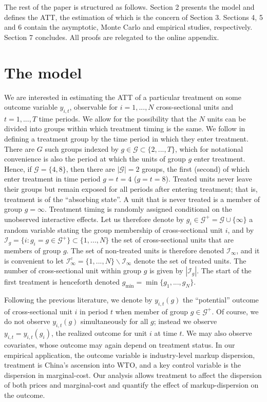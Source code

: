 \documentclass[12pt,fleqn]{article}
\begin{document}
The rest of the paper is structured as follows. Section 2 presents the model and defines the ATT, the estimation of which is the concern of Section 3. Sections 4, 5 and 6 contain the asymptotic, Monte Carlo and empirical studies, respectively. Section 7 concludes. All proofs are relegated to the online appendix.

\section{The model}

We are interested in estimating the ATT of a particular treatment on some outcome variable $y_{i,t}$, observable for $i=1,...,N$ cross-sectional units and $t=1,...,T$ time periods. We allow for the possibility that the $N$ units can be divided into groups within which treatment timing is the same. We follow \citet{Callaway_SantAnna_2020} in defining a treatment group by the time period in which they enter treatment. There are $G$ such groups indexed by $g\in \mathcal{G} \subset \{2,...,T\}$, which for notational convenience is also the period at which the units of group $g$ enter treatment. Hence, if $\mathcal{G} = \{4,8\}$, then there are $|\mathcal{G}| = 2$ groups, the first (second) of which enter treatment in time period $g = t=4$ ($g = t=8$). Treated units never leave their groups but remain exposed for all periods after entering treatment; that is, treatment is of the ``absorbing state''. A unit that is never treated is a member of group $g=\infty$. Treatment timing is randomly assigned conditional on the unobserved interactive effects. Let us therefore denote by $g_i \in \mathcal{G}^+ = \mathcal{G} \cup \{\infty\}$ a random variable stating the group membership of cross-sectional unit $i$, and by $\mathcal{I}_g = \{i: g_i = g \in \mathcal{G}^+\} \subset \{1,...,N\}$ the set of cross-sectional units that are members of group $g$. The set of non-treated units is therefore denoted $\mathcal{I}_\infty$, and it is convenient to let $\mathcal{I}_\infty^c = \{1,...,N\}\backslash \mathcal{I}_\infty$ denote the set of treated units. The number of cross-sectional unit within group $g$ is given by $|\mathcal{I}_g|$. The start of the first treatment is henceforth denoted $g_{\min} = \min\{g_1,...,g_N\}$.

Following the previous literature, we denote by $y_{i,t}(g)$ the ``potential'' outcome of cross-sectional unit $i$ in period $t$ when member of group $g \in \mathcal{G}^+$. Of course, we do not observe $y_{i,t}(g)$ simultaneously for all $g$; instead we observe $y_{i,t} = y_{i,t}(g_i)$, the realized outcome for unit $i$ at time $t$. We may also observe covariates, whose outcome may again depend on treatment status. In our empirical application, the outcome variable is industry-level markup dispersion, treatment is China's ascension into WTO, and a key control variable is the dispersion in marginal-cost. Our analysis allows treatment to affect the dispersion of both prices and marginal-cost and quantify the effect of markup-dispersion on the outcome.
\end{document}
